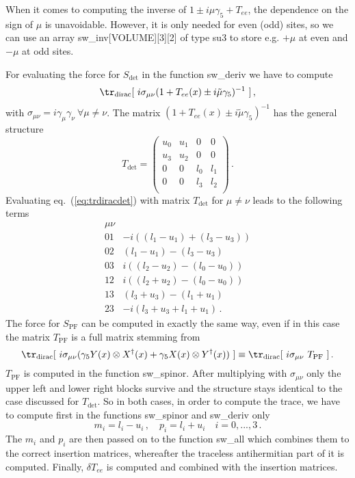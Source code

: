 When it comes to computing the inverse of $1\pm i \mu\gamma_5 +
T_{ee}$, the dependence on the sign of $\mu$ is unavoidable. However,
it is only needed for even (odd) sites, so we can use an array
{\ttfamily sw\_inv[VOLUME][3][2]} of type {\ttfamily su3} to store
e.g. $+\mu$ at even and $-\mu$ at odd sites.

For evaluating the force for $S_\mathrm{det}$ in the function
{\ttfamily sw\_deriv} we have to compute
\begin{equation}
  \label{eq:trdiracdet}
  \tr_\mathrm{dirac}[\ i\sigma_{\mu\nu}(1+T_{ee}(x)\pm
  i\tilde\mu\gamma_5)^{-1}\ ]\, ,
\end{equation}
with $\sigma_{\mu\nu} = i\gamma_\mu\gamma_\nu\ \forall \mu\neq\nu$.
The matrix $(1+T_{ee}(x)\pm i\tilde\mu\gamma_5)^{-1}$ has the general
structure
\[
T_\mathrm{det} = 
\begin{pmatrix}
  u_0 & u_1 & 0 & 0 \\
  u_3 & u_2 & 0 & 0 \\
  0 & 0 & l_0 & l_1 \\
  0 & 0 & l_3 & l_2 \\
\end{pmatrix}\,.
\]
Evaluating eq.~(\ref{eq:trdiracdet}) with matrix $T_\mathrm{det}$ for
$\mu\neq\nu$ leads to the following terms
\begin{eqnarray*}
  \label{eq:trsigma}
  \mu\nu & \\
  01 & -i (( l_1 -u_1) + (l_3-u_3))\\
  02 & (l_1 - u_1) - (l_3 - u_3)\\
  03 & i((l_2-u_2) - (l_0-u_0))\\
  12 & i((l_2+u_2) - (l_0-u_0))\\
  13 & (l_3+u_3) - (l_1 + u_1)\\
  23 & -i(l_3+u_3+l_1+u_1)\,.
\end{eqnarray*}
The force for $S_\mathrm{PF}$ can be computed in exactly the same way,
even if in this case the matrix $T_\mathrm{PF}$ is a full matrix
stemming from 
\begin{equation}
  \label{eq:trdiracpf}
  \tr_\mathrm{dirac}[\ i\sigma_{\mu\nu}(\gamma_5Y(x)\otimes
  X^\dagger(x) + \gamma_5X(x)\otimes Y^\dagger(x))\ ]\equiv
  \tr_\mathrm{dirac}[\ i\sigma_{\mu\nu}\ T_\mathrm{PF}\ ]\, .
\end{equation}
$T_\mathrm{PF}$ is computed in the function {\ttfamily sw\_spinor}.
After multiplying with 
$\sigma_{\mu\nu}$ only the upper left and lower right blocks survive
and the structure stays identical to the case discussed for
$T_\mathrm{det}$. So in both cases, in order to compute the trace, we
have to compute first in the functions {\ttfamily sw\_spinor} and
{\ttfamily sw\_deriv} only
\begin{equation}
  m_i = l_i - u_i\,,\quad p_i = l_i + u_i\quad i = 0,...,3\,.
\end{equation}
The $m_i$ and $p_i$ are then passed on to the function {\ttfamily
  sw\_all} which combines them to the correct insertion matrices,
whereafter the traceless antihermitian part of it is
computed. Finally, $\delta T_{ee}$ is computed and combined with the
insertion matrices.

